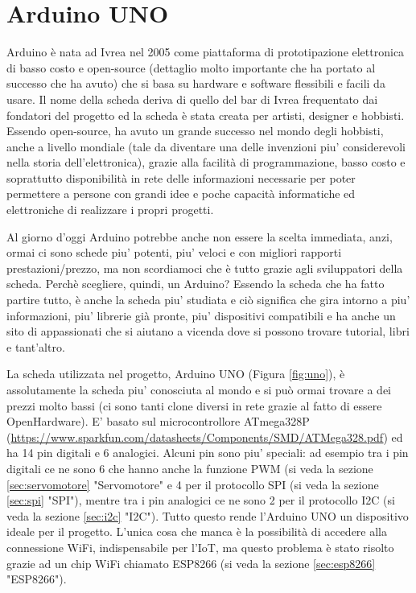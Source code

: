 \documentclass[12pt]{report}
\begin{document}
%
\section{Arduino UNO}
%

Arduino\cite{arduino_storia} è nata ad Ivrea nel 2005 come piattaforma di prototipazione elettronica di basso costo e open-source (dettaglio molto importante che ha portato al successo che ha avuto) che si basa su hardware e software flessibili e facili da usare. Il nome della scheda deriva di quello del bar di Ivrea frequentato dai fondatori del progetto ed la scheda è stata creata per artisti, designer e hobbisti. Essendo open-source, ha avuto un grande successo nel mondo degli hobbisti, anche a livello mondiale (tale da diventare una delle invenzioni piu' considerevoli nella storia dell'elettronica), grazie alla facilità di programmazione, basso costo e soprattutto disponibilità in rete delle informazioni necessarie per poter permettere a persone con grandi idee e poche capacità informatiche ed elettroniche di realizzare i propri progetti. 

Al giorno d'oggi Arduino potrebbe anche non essere la scelta immediata, anzi, ormai ci sono schede piu' potenti, piu' veloci e con migliori rapporti prestazioni/prezzo, ma non scordiamoci che è tutto grazie agli sviluppatori della scheda. Perchè scegliere, quindi, un Arduino? Essendo la scheda che ha fatto partire tutto, è anche la scheda piu' studiata e ciò significa che gira intorno a piu' informazioni, piu' librerie già pronte, piu' dispositivi compatibili e ha anche un sito di appassionati che si aiutano a vicenda dove si possono trovare tutorial, libri e tant'altro.

La scheda utilizzata nel progetto, Arduino UNO (Figura \ref{fig:uno}), è assolutamente la scheda piu' conosciuta al mondo e si può ormai trovare a dei prezzi molto bassi (ci sono tanti clone diversi in rete grazie al fatto di essere OpenHardware). E' basato sul microcontrollore ATmega328P (\url{https://www.sparkfun.com/datasheets/Components/SMD/ATMega328.pdf}) ed ha 14 pin digitali e 6 analogici. Alcuni pin sono piu' speciali: ad esempio tra i pin digitali ce ne sono 6 che hanno anche la funzione PWM (si veda la sezione \ref{sec:servomotore} "Servomotore" e 4 per il protocollo SPI (si veda la sezione \ref{sec:spi} "SPI"), mentre tra i pin analogici ce ne sono 2 per il protocollo I2C (si veda la sezione \ref{sec:i2c} "I2C"). Tutto questo rende l'Arduino UNO un dispositivo ideale per il progetto. L'unica cosa che manca è la possibilità di accedere alla connessione WiFi, indispensabile per l'IoT, ma questo problema è stato risolto grazie ad un chip WiFi chiamato ESP8266 (si veda la sezione \ref{sec:esp8266} "ESP8266").
\end{document}

